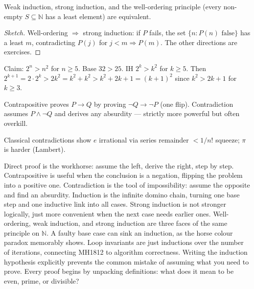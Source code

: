 \begin{theorem}
Weak induction, strong induction, and the well-ordering principle (every non-empty $S\subseteq\mathbb{N}$ has a least element) are equivalent.
\end{theorem}
\begin{proof}[Sketch] Well-ordering $\Rightarrow$ strong induction: if $P$ fails, the set $\{n:P(n)\text{ false}\}$ has a least $m$, contradicting $P(j)$ for $j<m\Rightarrow P(m)$. The other directions are exercises.
\end{proof}

\begin{example}
Claim: $2^n>n^2$ for $n\ge5$. Base $32>25$. IH $2^k>k^2$ for $k\ge5$. Then $2^{k+1}=2\cdot2^k>2k^2=k^2+k^2>k^2+2k+1=(k+1)^2$ since $k^2>2k+1$ for $k\ge3$.
\end{example}


\begin{theorem}
Contrapositive proves $P\to Q$ by proving $\neg Q\to\neg P$ (one flip). Contradiction assumes $P\land\neg Q$ and derives any absurdity --- strictly more powerful but often overkill.
\end{theorem}

\begin{example}
Classical contradictions show $e$ irrational via series remainder $<1/n!$ squeeze; $\pi$ is harder (Lambert).
\end{example}

Direct proof is the workhorse: assume the left, derive the right, step by step.
Contrapositive is useful when the conclusion is a negation, flipping the problem into a positive one.
Contradiction is the tool of impossibility: assume the opposite and find an absurdity.
Induction is the infinite domino chain, turning one base step and one inductive link into all cases.
Strong induction is not stronger logically, just more convenient when the next case needs earlier ones.
Well-ordering, weak induction, and strong induction are three faces of the same principle on $\mathbb{N}$.
A faulty base case can sink an induction, as the horse colour paradox memorably shows.
Loop invariants are just inductions over the number of iterations, connecting MH1812 to algorithm correctness.
Writing the induction hypothesis explicitly prevents the common mistake of assuming what you need to prove.
Every proof begins by unpacking definitions: what does it mean to be even, prime, or divisible?

